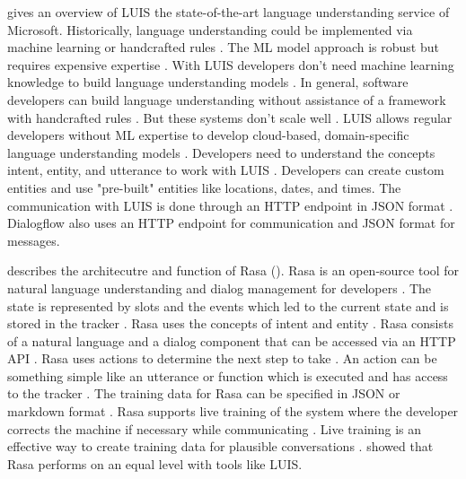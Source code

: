 \citet{luis2015williams} gives an overview of LUIS the state-of-the-art language understanding service of Microsoft.
Historically, language understanding could be implemented via machine learning or handcrafted rules \cite{luis2015williams}.
The ML model approach is robust but requires expensive expertise \cite{luis2015williams}. 
With LUIS developers don't need machine learning knowledge to build language understanding models \cite{luis2015williams}.
In general, software developers can build language understanding without assistance of a framework
with handcrafted rules \citet{luis2015williams}. 
But these systems don't scale well \cite{luis2015williams}.
LUIS allows regular developers without ML expertise to develop cloud-based, domain-specific language 
understanding models \cite{luis2015williams}.
Developers need to understand the concepts intent, entity, and utterance to work with LUIS \cite{luis2015williams}.
Developers can create custom entities and use "pre-built" entities like locations, dates, and times.
The communication with LUIS is done through an HTTP endpoint in JSON format \cite{luis2015williams}. 
Dialogflow also uses an HTTP endpoint for communication and JSON format for messages. 

\citet{rasabocklisch2017} describes the architecutre and function of Rasa (\citet{singhbuilding, braunEvaluatingNLU, buiildChatbotsPython}).
Rasa is an open-source tool for natural language understanding and dialog management for developers \cite{rasabocklisch2017}.
The state is represented by slots and the events which led to the current state and is stored in the tracker \cite{rasabocklisch2017}. 
Rasa uses the concepts of intent and entity \cite{rasabocklisch2017}. 
Rasa consists of a natural language and a dialog component that can be accessed via an HTTP API \cite{rasabocklisch2017}.
Rasa uses actions to determine the next step to take \cite{rasabocklisch2017}. 
An action can be something simple like an utterance or function which is executed and has access to the tracker \cite{rasabocklisch2017}.
The training data for Rasa can be specified in JSON or markdown format \cite{rasabocklisch2017}.
Rasa supports live training of the system where the developer corrects the machine if necessary while communicating \cite{rasabocklisch2017}.
Live training is an effective way to create training data for plausible conversations \cite{rasabocklisch2017}.
\citet{braunEvaluatingNLU} showed that Rasa performs on an equal level with tools like LUIS.

